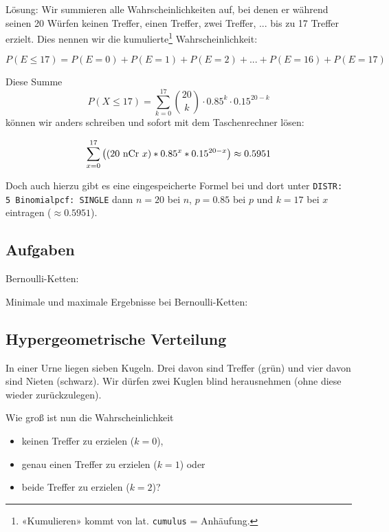 Lösung: Wir summieren alle Wahrscheinlichkeiten auf, bei denen er
während seinen 20 Würfen
keinen Treffer, einen Treffer, zwei Treffer, ... bis zu 17 Treffer
erzielt. Dies nennen wir die kumulierte\footnote{«Kumulieren» kommt von
  lat. \texttt{cumulus} = Anhäufung.} Wahrscheinlichkeit:

$$P(E\le 17) = P(E=0) + P(E=1) + P(E=2) + ... + P(E=16) + P(E=17)$$

Diese Summe
$$P(X\le 17) = \sum_{k=0}^{17} {20 \choose k} \cdot 0.85^k \cdot 0.15^{20-k}$$
können wir anders schreiben und sofort mit dem
Taschenrechner lösen:

$$\sum_{x=0}^{17}\left(( 20 \textrm{\,\,nCr\,\,} x ) * 0.85^x *
0.15^{20-x}\right) \approx 0.5951$$


Doch auch hierzu gibt es eine eingespeicherte Formel
bei
 und dort unter \texttt{DISTR: 5
  Binomialpcf: SINGLE} dann $n=20$ bei $n$, $p=0.85$ bei $p$ und
$k=17$ bei $x$ eintragen ($\approx 0.5951$).


\newpage

\subsection*{Aufgaben}
Bernoulli-Ketten:


Minimale und maximale Ergebnisse bei Bernoulli-Ketten:

\newpage



\subsection{Hypergeometrische Verteilung}
In einer Urne liegen sieben Kugeln. Drei davon sind Treffer (grün) und vier davon sind Nieten (schwarz).
Wir dürfen zwei Kuglen blind herausnehmen (ohne diese wieder zurückzulegen).


Wie groß ist nun die Wahrscheinlichkeit
\begin{itemize}
\item keinen Treffer zu erzielen ($k=0$),
\item genau einen Treffer zu erzielen ($k=1$) oder
\item beide Treffer zu erzielen ($k=2$)?
\end{itemize}

